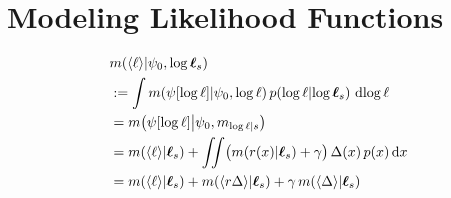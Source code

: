 \documentclass{article}
\begin{document}
% 
% 
% 
% 
% 
% 
% 
% 
% 
% 


\section{Modeling Likelihood Functions}

\begin{align}
& \mean{\inty{\lfn}}{\psi_0,\tvr_s} \nonumber\\
& \deq \int \mean{\psi[\tr]}{\psi_0,\tr}
\p{\tr}{\tvr_s}\, \ud \tr 
\nonumber\\
& = \mean{\psi[\tr]}{\psi_0,m_{\tr|s}} \nonumber\\
& = \mean{\inty{\lfn}}{\vr_s} + \iint \bigl(\mean{r(\lfv)}{\vr_s}+\gamma\bigr)\,\Delta(\lfv)\,\po{\lfv}\ud\lfv
\nonumber\\
& = \mean{\inty{\lfn}}{\vr_s} + \mean{\inty{r \Delta}}{\vr_s} + \gamma\, \mean{\inty{ \Delta}}{\vr_s}
\label{eq:mean_ev}
\end{align}
\end{document}
